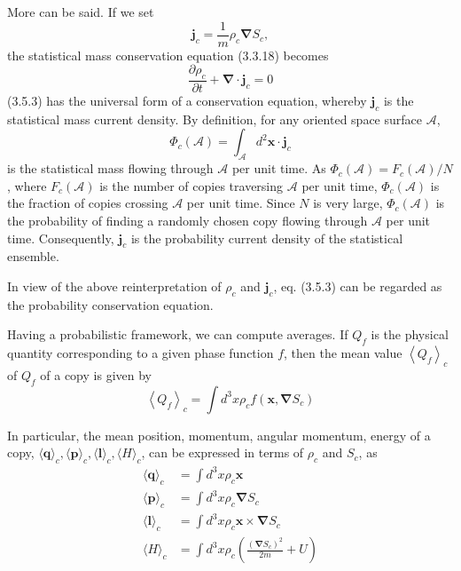 \documentclass{article}
\begin{document}
More can be said. If we set
$$
\begin{equation*}
\boldsymbol{j}_{c}=\frac{1}{m} \rho_{c} \boldsymbol{\nabla} S_{c}, \tag{3.5.2}
\end{equation*}
$$
the statistical mass conservation equation (3.3.18) becomes
$$
\begin{equation*}
\frac{\partial \rho_{c}}{\partial t}+\boldsymbol{\nabla} \cdot \boldsymbol{j}_{c}=0 \tag{3.5.3}
\end{equation*}
$$
(3.5.3) has the universal form of a conservation equation, whereby $\boldsymbol{j}_{c}$ is the statistical mass current density. By definition, for any oriented space surface $\mathcal{A}$,
$$
\begin{equation*}
\Phi_{c}(\mathcal{A})=\int_{\mathcal{A}} d^{2} \boldsymbol{x} \cdot \boldsymbol{j}_{c} \tag{3.5.4}
\end{equation*}
$$
is the statistical mass flowing through $\mathcal{A}$ per unit time. As $\Phi_{c}(\mathcal{A})=F_{c}(\mathcal{A}) / N$, where $F_{c}(\mathcal{A})$ is the number of copies traversing $\mathcal{A}$ per unit time, $\Phi_{c}(\mathcal{A})$ is the fraction of copies crossing $\mathcal{A}$ per unit time. Since $N$ is very large,
$\Phi_{c}(\mathcal{A})$ is the probability of finding a randomly chosen copy flowing through $\mathcal{A}$ per unit time. Consequently, $\boldsymbol{j}_{c}$ is the probability current density of the statistical ensemble.

In view of the above reinterpretation of $\rho_{c}$ and $\boldsymbol{j}_{c}$, eq. (3.5.3) can be regarded as the probability conservation equation.

Having a probabilistic framework, we can compute averages. If $Q_{f}$ is the physical quantity corresponding to a given phase function $f$, then the mean value $\left\langle Q_{f}\right\rangle_{c}$ of $Q_{f}$ of a copy is given by
$$
\begin{equation*}
\left\langle Q_{f}\right\rangle_{c}=\int d^{3} x \rho_{c} f\left(\boldsymbol{x}, \boldsymbol{\nabla} S_{c}\right) \tag{3.5.5}
\end{equation*}
$$

In particular, the mean position, momentum, angular momentum, energy of a copy, $\langle\boldsymbol{q}\rangle_{c},\langle\boldsymbol{p}\rangle_{c},\langle\boldsymbol{l}\rangle_{c},\langle H\rangle_{c}$, can be expressed in terms of $\rho_{c}$ and $S_{c}$, as
$$
\begin{align*}
\langle\boldsymbol{q}\rangle_{c} & =\int d^{3} x \rho_{c} \boldsymbol{x}  \tag{3.5.6}\\
\langle\boldsymbol{p}\rangle_{c} & =\int d^{3} x \rho_{c} \boldsymbol{\nabla} S_{c}  \tag{3.5.7}\\
\langle\boldsymbol{l}\rangle_{c} & =\int d^{3} x \rho_{c} \boldsymbol{x} \times \boldsymbol{\nabla} S_{c}  \tag{3.5.8}\\
\langle H\rangle_{c} & =\int d^{3} x \rho_{c}\left(\frac{\left(\boldsymbol{\nabla} S_{c}\right)^{2}}{2 m}+U\right) \tag{3.5.9}
\end{align*}
$$
\end{document}
